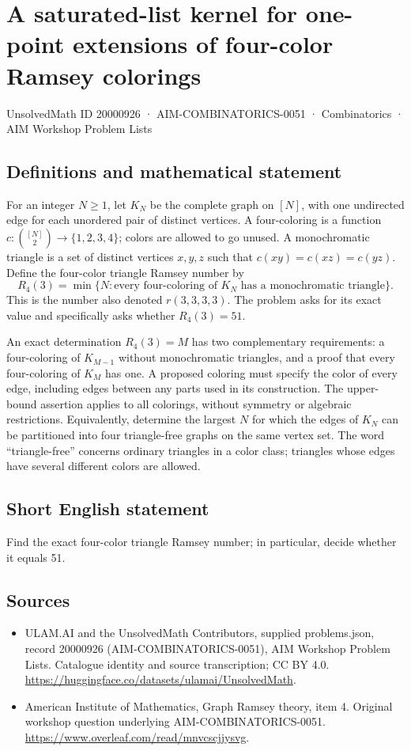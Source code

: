 \documentclass[11pt,a4paper]{article}
\begin{document}
\section*{A saturated-list kernel for one-point extensions of four-color Ramsey colorings}\label{20000926}
{\small UnsolvedMath ID 20000926 · AIM-COMBINATORICS-0051 · Combinatorics · AIM Workshop Problem Lists}
\subsection{Definitions and mathematical statement}
For an integer $N\ge1$, let $K_N$ be the complete graph on $[N]$,
with one undirected edge for each unordered pair of distinct vertices.
A four-coloring is a function
$c:\binom{[N]}2\to\{1,2,3,4\}$; colors are allowed to go unused.
A monochromatic triangle is a set of distinct vertices $x,y,z$ such
that $c(xy)=c(xz)=c(yz)$.
Define the four-color triangle Ramsey number by
\[
 R_4(3)=\min\{N:\text{every four-coloring of }K_N
                           \text{ has a monochromatic triangle}\}.
\]
This is the number also denoted $r(3,3,3,3)$.
The problem asks for its exact value and specifically asks whether
$R_4(3)=51$.

An exact determination $R_4(3)=M$ has two complementary requirements:
a four-coloring of $K_{M-1}$ without monochromatic triangles, and a
proof that every four-coloring of $K_M$ has one. A proposed coloring
must specify the color of every edge, including edges between any
parts used in its construction. The upper-bound assertion applies to
all colorings, without symmetry or algebraic restrictions.
Equivalently, determine the largest $N$ for which the edges of $K_N$
can be partitioned into four triangle-free graphs on the same vertex
set. The word ``triangle-free'' concerns ordinary triangles in a color
class; triangles whose edges have several different colors are allowed.
\subsection{Short English statement}
Find the exact four-color triangle Ramsey number; in particular, decide whether it equals 51.
\subsection{Sources}
\begin{itemize}
\item[S1] ULAM.AI and the UnsolvedMath Contributors, supplied problems.json, record 20000926 (AIM-COMBINATORICS-0051), AIM Workshop Problem Lists. Catalogue identity and source transcription; CC BY 4.0.
\url{https://huggingface.co/datasets/ulamai/UnsolvedMath}.
\item[S2] American Institute of Mathematics, Graph Ramsey theory, item 4. Original workshop question underlying AIM-COMBINATORICS-0051.
\url{https://www.overleaf.com/read/mnvcscjjysvg}.
\end{itemize}
\end{document}
